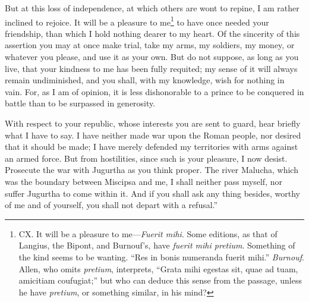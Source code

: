 But at this loss of independence, at which others are wont to repine,
I am rather inclined to rejoice. It will be a pleasure to me\footnote{CX. It will be a pleasure to me—\emph{Fuerit mihi}. Some editions,
as that of Langius, the Bipont, and Burnouf's, have \emph{fuerit mihi
pretium}. Something of the kind seems to be wanting. ``Res in bonis
numeranda fuerit mihi.'' \emph{Burnouf}. Allen, who omits \emph{pretium},
interprets, ``Grata mihi egestas sit, quae ad tuam, amicitiam
coufugiat;'' but who can deduce this sense from the passage, unless he
have \emph{pretium}, or something similar, in his mind?} to
have once needed your friendship, than which I hold nothing dearer to
my heart. Of the sincerity of this assertion you may at once make
trial, take my arms, my soldiers, my money, or whatever you please,
and use it as your own. But do not suppose, as long as you live, that
your kindness to me has been fully requited; my sense of it will
always remain undiminished, and you shall, with my knowledge, wish for
nothing in vain. For, as I am of opinion, it is less dishonorable to a
prince to be conquered in battle than to be surpassed in generosity.

With respect to your republic, whose interests you are sent to guard,
hear briefly what I have to say. I have neither made war upon the
Roman people, nor desired that it should be made; I have merely
defended my territories with arms against an armed force. But from
hostilities, since such is your pleasure, I now desist. Prosecute the
war with Jugurtha as you think proper. The river Malucha, which was
the boundary between Miscipsa and me, I shall neither pass myself, nor
suffer Jugurtha to come within it. And if you shall ask any thing
besides, worthy of me and of yourself, you shall not depart with a
refusal.''

